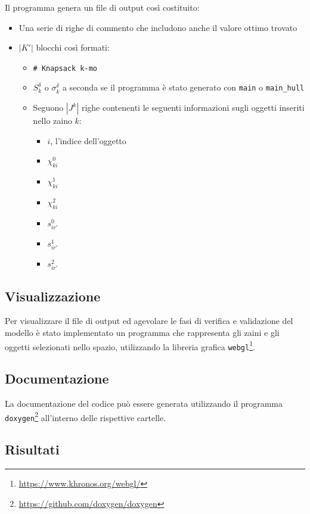\documentclass{scrartcl}
\begin{document}
Il programma genera un file di output così costituito:
\begin{itemize}
	\item Una serie di righe di commento che includono anche il valore ottimo trovato
	\item $|K'|$ blocchi così formati:
		\begin{itemize}
			\item \verb|# Knapsack k-mo|
			\item $S_k^\delta$ o $\sigma_k^\delta$ a seconda se il programma è stato generato con \verb|main| o \verb|main_hull|
			\item Seguono $|J^k|$ righe contenenti le seguenti informazioni sugli oggetti inseriti nello zaino $k$:
			\begin{itemize}
				\item $i$, l'indice dell'oggetto
				\item $\chi_{ki}^0$
				\item $\chi_{ki}^1$
				\item $\chi_{ki}^2$
				\item $s_{ir'}^0$
				\item $s_{ir'}^1$
				\item $s_{ir'}^2$
			\end{itemize}
		\end{itemize}
\end{itemize}






\subsection{Visualizzazione}
Per visualizzare il file di output ed agevolare le fasi di verifica e validazione del modello è stato implementato un programma che rappresenta gli zaini e gli oggetti selezionati nello spazio, utilizzando la libreria grafica \verb|webgl|\footnote{\url{https://www.khronos.org/webgl/}}.

\subsection{Documentazione}
La documentazione del codice può essere generata utilizzando il programma \verb|doxygen|\footnote{\url{https://github.com/doxygen/doxygen}} all'interno delle rispettive cartelle.

\subsection{Risultati}
\end{document}
